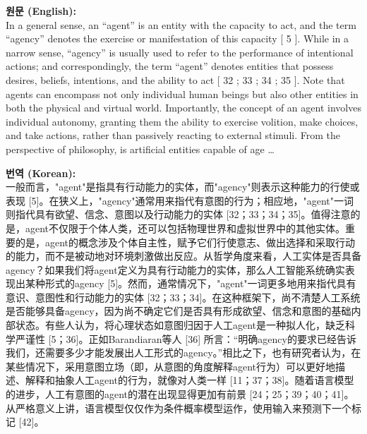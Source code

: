 \documentclass[12pt,a4paper]{article}
\begin{document}
\begin{mdframed}[style=orig]
\noindent\textbf{\small 원문 (English):}\\[2pt]
\small In a general sense, an “agent” is an entity with the capacity to act, and the term “agency” denotes the exercise or manifestation of this capacity [ 5 ]. While in a narrow sense, “agency” is usually used to refer to the performance of intentional actions; and correspondingly, the term “agent” denotes entities that possess desires, beliefs, intentions, and the ability to act [ 32 ; 33 ; 34 ; 35 ]. Note that agents can encompass not only individual human beings but also other entities in both the physical and virtual world. Importantly, the concept of an agent involves individual autonomy, granting them the ability to exercise volition, make choices, and take actions, rather than passively reacting to external stimuli. From the perspective of philosophy, is artificial entities capable of age \ldots
\end{mdframed}
\vspace{0.4em}

\begin{mdframed}[style=ko]
\noindent\textbf{\small 번역 (Korean):}\\[2pt]
一般而言，"agent"是指具有行动能力的实体，而"agency"则表示这种能力的行使或表现 [5]。在狭义上，"agency"通常用来指代有意图的行为；相应地，"agent"一词则指代具有欲望、信念、意图以及行动能力的实体 [32；33；34；35]。值得注意的是，agent不仅限于个体人类，还可以包括物理世界和虚拟世界中的其他实体。重要的是，agent的概念涉及个体自主性，赋予它们行使意志、做出选择和采取行动的能力，而不是被动地对环境刺激做出反应。从哲学角度来看，人工实体是否具备agency？如果我们将agent定义为具有行动能力的实体，那么人工智能系统确实表现出某种形式的agency [5]。然而，通常情况下，"agent"一词更多地用来指代具有意识、意图性和行动能力的实体 [32；33；34]。在这种框架下，尚不清楚人工系统是否能够具备agency，因为尚不确定它们是否具有形成欲望、信念和意图的基础内部状态。有些人认为，将心理状态如意图归因于人工agent是一种拟人化，缺乏科学严谨性 [5；36]。正如Barandiaran等人 [36] 所言：“明确agency的要求已经告诉我们，还需要多少才能发展出人工形式的agency。”相比之下，也有研究者认为，在某些情况下，采用意图立场（即，从意图的角度解释agent行为）可以更好地描述、解释和抽象人工agent的行为，就像对人类一样 [11；37；38]。随着语言模型的进步，人工有意图的agent的潜在出现显得更加有前景 [24；25；39；40；41]。从严格意义上讲，语言模型仅仅作为条件概率模型运作，使用输入来预测下一个标记 [42]。
\end{mdframed}
\vspace{1em}
\end{document}
